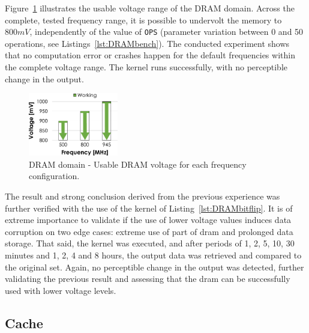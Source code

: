 Figure~\ref{fig:DRAM_guardband} illustrates the usable voltage range of the DRAM domain. Across the complete, tested frequency range, it is possible to undervolt the memory to $800mV$, independently of the value of \texttt{OPS} (parameter variation between 0 and 50 operations, see Listings~\ref{lst:DRAMbench}).
The conducted experiment shows that no computation error or crashes happen for the default frequencies within the complete voltage range. The kernel runs successfully, with no perceptible change in the output.


\begin{figure}[htb]
  \centering
  \includegraphics[width=0.35\textwidth]{Figures/GPU_characterization/DRAM_Guardband.pdf}
  \caption{DRAM domain - Usable DRAM voltage for each frequency configuration.}
  \label{fig:DRAM_guardband}
\end{figure}

The result and strong conclusion derived from the previous experience was further verified with the use of the kernel of Listing~\ref{lst:DRAMbitflip}. It is of extreme importance to validate if the use of lower voltage values induces data corruption on two edge cases: extreme use of part of \acrshort{dram} and prolonged data storage. That said, the kernel was executed, and after periods of 1, 2, 5, 10, 30 minutes and 1, 2, 4 and 8 hours, the output data was retrieved and compared to the original set. Again, no perceptible change in the output was detected, further validating the previous result and assessing that the \acrshort{dram} can be successfully used with lower voltage levels. 

\subsection{Cache}

